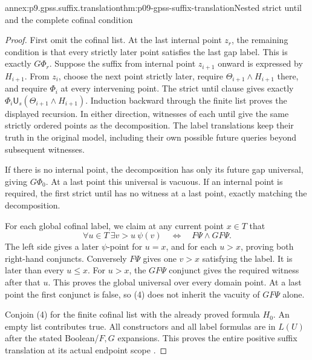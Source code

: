\begin{annexitem}{annex:p9.gpss.suffix.translation}{thm:p09-gpss-suffix-translation}{Nested strict until and the complete cofinal condition}
\begin{proof}
First omit the cofinal list. At the
last internal point \(z_r\), the
remaining condition is that every
strictly later point satisfies the
last gap label. This is exactly
\(G\Phi_r\). Suppose the suffix
from internal point \(z_{i+1}\)
onward is expressed by \(H_{i+1}\).
From \(z_i\), choose the next
point strictly later, require
\(\Theta_{i+1}\land H_{i+1}\)
there, and require \(\Phi_i\)
at every intervening point. The
strict until clause gives exactly
\(\Phi_i\mathbin{\mathsf U_s}
(\Theta_{i+1}\land H_{i+1})\).
Induction backward through the
finite list proves the displayed
recursion. In either direction,
witnesses of each until give the
same strictly ordered points as
the decomposition. The label
translations keep their truth in
the original model, including
their own possible future queries
beyond subsequent witnesses.

If there is no internal point,
the decomposition has only its
future gap universal, giving
\(G\Phi_0\). At a last point
this universal is vacuous. If
an internal point is required,
the first strict until has no
witness at a last point, exactly
matching the decomposition.

For each global cofinal label,
we claim at any current
point \(x\in T\) that
\[
 \forall u\in T\ \exists v>u\ \psi(v)
       \quad\Longleftrightarrow\quad
                         F\Psi\land GF\Psi.
 \tag{4}
\]
The left side gives a later
\(\psi\)-point for \(u=x\),
and for each \(u>x\), proving
both right-hand conjuncts.
Conversely \(F\Psi\) gives
one \(v>x\) satisfying the
label. It is later than every
\(u\leq x\). For \(u>x\),
the \(GF\Psi\) conjunct
gives the required witness
after that \(u\). This
proves the global universal
over every domain point.
At a last point the first
conjunct is false, so (4)
does not inherit the vacuity
of \(GF\Psi\) alone.

Conjoin (4) for the finite
cofinal list with the already
proved formula \(H_0\).
An empty list contributes true.
All constructors and all label
formulas are in \(L(U)\) after
the stated Boolean/\(F,G\)
expansions. This proves the
entire positive suffix translation
at its actual endpoint scope
\cite[p.~171]{GabbayPnueliShelahStavi1980}.
\end{proof}
\end{annexitem}

